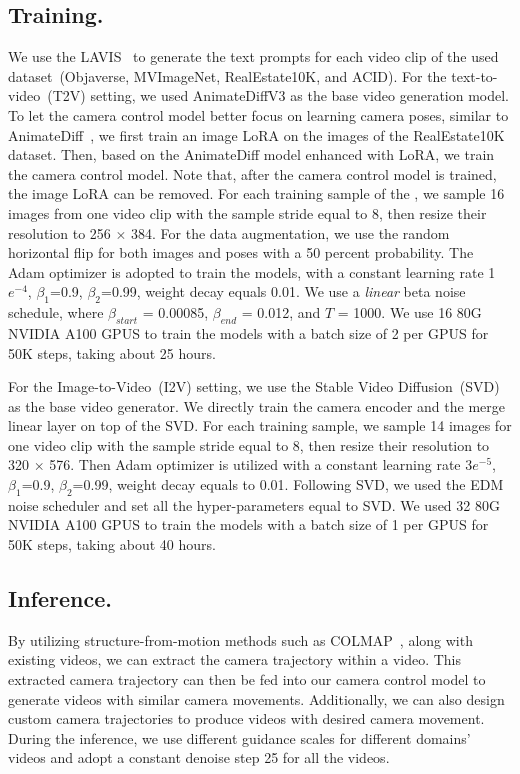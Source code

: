 \subsection{Training.}\label{suppsubsec:train_detail}
We use the LAVIS~\citep{li-etal-2023-lavis} to generate the text prompts for each video clip of the used dataset~(Objaverse, MVImageNet, RealEstate10K, and ACID). 
%
For the text-to-video~(T2V) setting, we used AnimateDiffV3 as the base video generation model.
%
To let the camera control model better focus on learning camera poses, similar to AnimateDiff~\citep{animatediff}, we first train an image LoRA on the images of the RealEstate10K dataset. 
%
Then, based on the AnimateDiff model enhanced with LoRA, we train the camera control model. 
%
Note that, after the camera control model is trained, the image LoRA can be removed.
%
For each training sample of the \method, we sample 16 images from one video clip with the sample stride equal to 8, then resize their resolution to 256 $\times$ 384.
%
For the data augmentation, we use the random horizontal flip for both images and poses with a 50 percent probability.
%
The Adam optimizer is adopted to train the models, with a constant learning rate 1$e^{-4}$, $\beta_1$=0.9, $\beta_2$=0.99, weight decay equals 0.01.
%
We use a \textit{linear} beta noise schedule, where $\beta_{start}$ = 0.00085, $\beta_{end}$ = 0.012, and $T$ = 1000.
%
We use 16 80G NVIDIA A100 GPUS to train the \method models with a batch size of 2 per GPUS for 50K steps, taking about 25 hours.

For the Image-to-Video~(I2V) setting, we use the Stable Video Diffusion~(SVD) as the base video generator.
%
We directly train the camera encoder and the merge linear layer on top of the SVD.
%
For each training sample, we sample 14 images for one video clip with the sample stride equal to 8, then resize their resolution to 320 $\times$ 576.
%
Then Adam optimizer is utilized with a constant learning rate 3$e^{-5}$, $\beta_1$=0.9, $\beta_2$=0.99, weight decay equals to 0.01.
%
Following SVD, we used the EDM~\citep{edm} noise scheduler and set all the hyper-parameters equal to SVD. 
% 
We used 32 80G NVIDIA A100 GPUS to train the models with a batch size of 1 per GPUS for 50K steps, taking about 40 hours.

\subsection{Inference.}\label{suppsubsec:inference_detail} By utilizing structure-from-motion methods such as COLMAP~\citep{schoenberger2016sfm}, along with existing videos, we can extract the camera trajectory within a video. 
%
This extracted camera trajectory can then be fed into our camera control model to generate videos with similar camera movements.
%
Additionally, we can also design custom camera trajectories to produce videos with desired camera movement. 
%
During the inference, we use different guidance scales for different domains' videos and adopt a constant denoise step 25 for all the videos.

